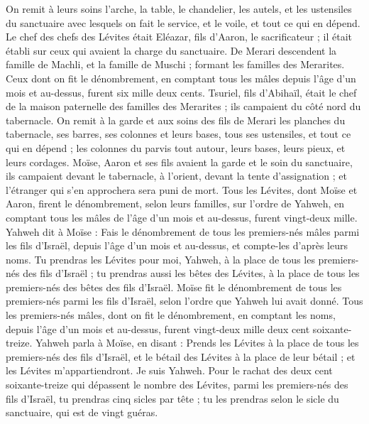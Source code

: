 \begin{multicols}{2}
On remit à leurs soins l'arche, la table, le chandelier, les autels, et les ustensiles du sanctuaire avec lesquels on fait le service, et le voile, et tout ce qui en dépend.
Le chef des chefs des Lévites était Eléazar, fils d'Aaron, le sacrificateur ; il était établi sur ceux qui avaient la charge du sanctuaire.
De Merari descendent la famille de Machli, et la famille de Muschi ; formant les familles des Merarites.
Ceux dont on fit le dénombrement, en comptant tous les mâles depuis l'âge d'un mois et au-dessus, furent six mille deux cents.
Tsuriel, fils d'Abihaïl, était le chef de la maison paternelle des familles des Merarites ; ils campaient du côté nord du tabernacle.
On remit à la garde et aux soins des fils de Merari les planches du tabernacle, ses barres, ses colonnes et leurs bases, tous ses ustensiles, et tout ce qui en dépend ;
les colonnes du parvis tout autour, leurs bases, leurs pieux, et leurs cordages.
Moïse, Aaron et ses fils avaient la garde et le soin du sanctuaire, ils campaient devant le tabernacle, à l’orient, devant la tente d'assignation ; et l’étranger qui s'en approchera sera puni de mort.
Tous les Lévites, dont Moïse et Aaron, firent le dénombrement, selon leurs familles, sur l’ordre de Yahweh, en comptant tous les mâles de l'âge d'un mois et au-dessus, furent vingt-deux mille.
Yahweh dit à Moïse : Fais le dénombrement de tous les premiers-nés mâles parmi les fils d'Israël, depuis l'âge d'un mois et au-dessus, et compte-les d’après leurs noms.
Tu prendras les Lévites pour moi, Yahweh, à la place de tous les premiers-nés des fils d'Israël ; tu prendras aussi les bêtes des Lévites, à la place de tous les premiers-nés des bêtes des fils d'Israël.
Moïse fit le dénombrement de tous les premiers-nés parmi les fils d’Israël, selon l’ordre que Yahweh lui avait donné.
Tous les premiers-nés mâles, dont on fit le dénombrement, en comptant les noms, depuis l'âge d'un mois et au-dessus, furent vingt-deux mille deux cent soixante-treize.
Yahweh parla à Moïse, en disant :
Prends les Lévites à la place de tous les premiers-nés des fils d'Israël, et le bétail des Lévites à la place de leur bétail ; et les Lévites m’appartiendront. Je suis Yahweh.
Pour le rachat des deux cent soixante-treize qui dépassent le nombre des Lévites, parmi les premiers-nés des fils d’Israël,
tu prendras cinq sicles par tête ; tu les prendras selon le sicle du sanctuaire, qui est de vingt guéras.

\end{multicols}
